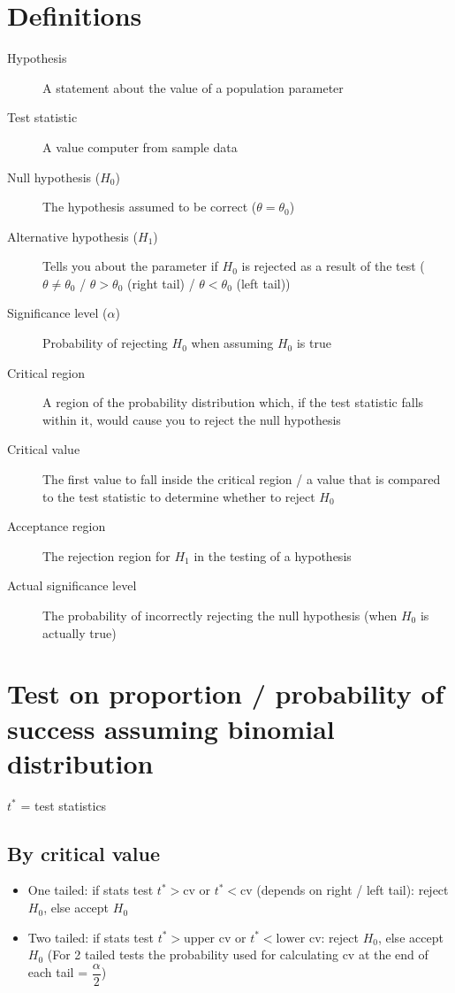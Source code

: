 \section{Definitions}
\begin{description}
    \item[Hypothesis] A statement about the value of a population parameter
    \item[Test statistic] A value computer from sample data
    \item[Null hypothesis ($H_0$)] The hypothesis assumed to be correct ($\theta=\theta_0$)
    \item[Alternative hypothesis ($H_1$)] Tells you about the parameter if $H_0$ is rejected as a result of the test ($\theta \neq \theta_0$ / $\theta>\theta_0$ (right tail) / $\theta<\theta_0$ (left tail))
    \item[Significance level ($\alpha$)] Probability of rejecting $H_0$ when assuming $H_0$ is true
    \item[Critical region] A region of the probability distribution which, if the test statistic falls within it, would cause you to reject the null hypothesis
    \item[Critical value] The first value to fall inside the critical region / a value that is compared to the test statistic to determine whether to reject $H_0$
    \item[Acceptance region] The rejection region for $H_1$ in the testing of a hypothesis
    \item[Actual significance level] The probability of incorrectly rejecting the null hypothesis (when $H_0$ is actually true)
\end{description}

\section{Test on proportion / probability of success assuming binomial distribution}
$t^*$ = test statistics
\subsection{By critical value}
\begin{itemize}
    \item One tailed: if stats test $t^* > \text{cv}$ or $t^* < \text{cv}$ (depends on right / left tail): reject $H_0$, else accept $H_0$
    \item Two tailed: if stats test $t^* > \text{upper cv}$ or $t^* < \text{lower cv}$: reject $H_0$, else accept $H_0$ (For 2 tailed tests the probability used for calculating cv at the end of each tail = $\dfrac{\alpha}{2}$)
\end{itemize}


